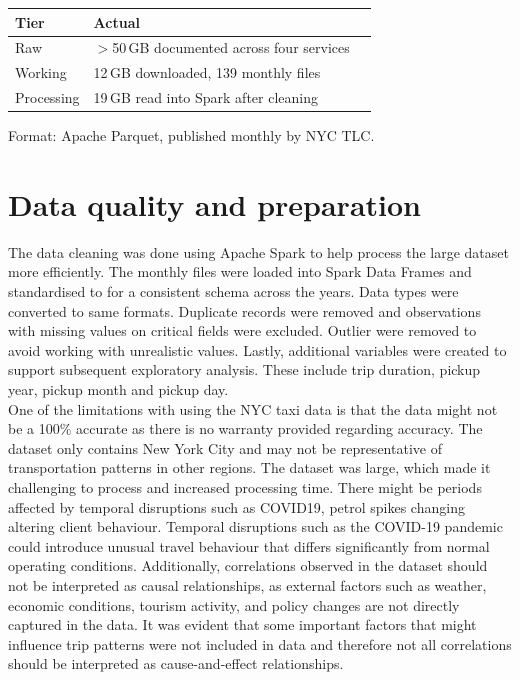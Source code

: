 \documentclass[conference]{IEEEtran}
\begin{document}
\begin{center}
\begin{tabular}{@{}lll@{}}
\toprule
\textbf{Tier} & \textbf{Actual} \\
\midrule
Raw        & $>$50\,GB documented across four services \\
Working    & 12\,GB downloaded, 139 monthly files \\
Processing & 19\,GB read into Spark after cleaning \\
\bottomrule
\end{tabular}
\end{center}

Format: Apache Parquet, published monthly by NYC TLC.

\section{Data quality and preparation}
The data cleaning was done using Apache Spark to help process the large dataset more efficiently. The monthly files were loaded into Spark Data Frames and standardised to for a consistent schema across the years. Data types were converted to same formats. Duplicate records were removed and observations with missing values on critical fields were excluded. Outlier were removed to avoid working with unrealistic values. Lastly, additional variables were created to support subsequent exploratory analysis. These include trip duration, pickup year, pickup month and pickup day.\\

One of the limitations with using the NYC taxi data is that the data might not be a 100\% accurate as there is no warranty provided regarding accuracy. The dataset only contains New York City and may not be representative of transportation patterns in other regions. The dataset was large, which made it challenging to process and increased processing time. There might be periods affected by temporal disruptions such as COVID19, petrol spikes changing altering client behaviour. Temporal disruptions such as the COVID-19 pandemic could introduce unusual travel behaviour that differs significantly from normal operating conditions. Additionally, correlations observed in the dataset should not be interpreted as causal relationships, as external factors such as weather, economic conditions, tourism activity, and policy changes are not directly captured in the data. It was evident that some important factors that might influence trip patterns were not included in data and therefore not all correlations should be interpreted as cause-and-effect relationships.
\end{document}
